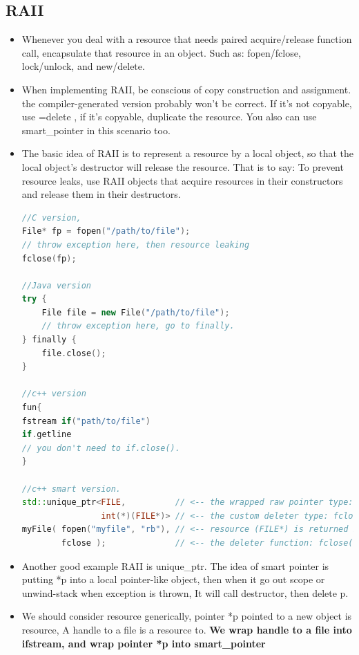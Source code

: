 \documentclass[a4paper,12pt,twoside]{book}
\begin{document}
\subsection{RAII}
\begin{itemize}
\item Whenever you deal with a resource that needs paired acquire/release function call, encapsulate that resource in an object.  Such as: fopen/fclose, lock/unlock, and new/delete.

\item When implementing RAII, be conscious of copy construction and assignment. the compiler-generated version probably won't be correct. If it's not copyable, use =delete , if it's copyable, duplicate the resource.  You also can use smart\_pointer in this scenario too.

\item The basic idea of RAII  is to represent a resource by a local object, so that the local object’s destructor will release the resource.  That is to say: To prevent resource leaks, use RAII objects that acquire resources in their constructors and release them in their destructors.
\begin{lstlisting}[frame=single, language=c++]
//C version,
File* fp = fopen("/path/to/file");
// throw exception here, then resource leaking
fclose(fp);

//Java version
try {
    File file = new File("/path/to/file");
    // throw exception here, go to finally.
} finally {
    file.close();
}

//c++ version
fun{
fstream if("path/to/file")
if.getline
// you don't need to if.close().
}

//c++ smart version.
std::unique_ptr<FILE,          // <-- the wrapped raw pointer type: FILE*
                int(*)(FILE*)> // <-- the custom deleter type: fclose() prototype
myFile( fopen("myfile", "rb"), // <-- resource (FILE*) is returned by fopen()
        fclose );              // <-- the deleter function: fclose()
\end{lstlisting}

\item Another good example RAII is unique\_ptr. The idea of smart pointer is putting *p into a local pointer-like object, then when it go out scope or unwind-stack when exception is thrown, It will call destructor, then delete p.

\item We should consider resource generically, pointer *p pointed to a new object is resource, A handle to a file is a resource to. \textbf{We wrap handle to a file into ifstream, and wrap pointer *p into smart\_pointer}


\end{itemize}
\end{document}
